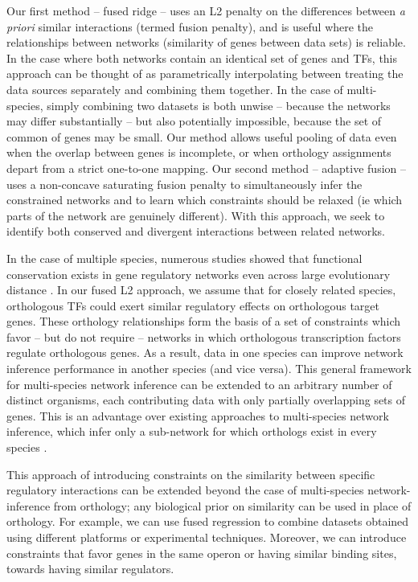 \documentclass[11pt]{article}
\begin{document}
Our first method -- fused ridge -- uses an L2 penalty on the differences between \textit{a priori} similar interactions (termed fusion penalty), and is useful where the relationships between networks (similarity of genes between data sets) is reliable. In the case where both networks contain an identical set of genes and TFs, this approach can be thought of as parametrically interpolating between treating the data sources separately and combining them together. In the case of multi-species, simply combining two datasets is both unwise -- because the networks may differ substantially -- but also potentially impossible, because the set of common of genes may be small. Our method allows useful pooling of data even when the overlap between genes is incomplete, or when orthology assignments depart from a strict one-to-one mapping. Our second method -- adaptive fusion -- uses a non-concave saturating fusion penalty to simultaneously infer the constrained networks and to learn which constraints should be relaxed (ie which parts of the network are genuinely different). With this approach, we seek to identify both conserved and divergent interactions between related networks.

In the case of multiple species, numerous studies showed that functional conservation exists in gene regulatory networks even across large evolutionary distance \cite{satou2006gene, hinman2009evolution,tanay2005conservation,erwin2009evolution}. In our fused L2 approach, we assume that for closely related species, orthologous TFs could exert similar regulatory effects on orthologous target genes. These orthology relationships form the basis of a set of constraints which favor -- but do not require -- networks in which orthologous transcription factors regulate orthologous genes. As a result, data in one species can improve network inference performance in another species  (and vice versa). This general framework for multi-species network inference can be extended to an arbitrary number of distinct organisms, each contributing data with only partially overlapping sets of genes. This is an advantage over existing approaches to multi-species network inference, which infer only a sub-network for which orthologs exist in every species \cite{joshi_multi-species_2015}. 

This approach of introducing constraints on the similarity between specific regulatory interactions can be extended beyond the case of multi-species network-inference from orthology; any biological prior on similarity can be used in place of orthology. For example, we can use fused regression to combine datasets obtained using different platforms or experimental techniques. Moreover, we can introduce constraints that favor genes in the same operon or having similar binding sites, towards having similar regulators.
\end{document}
